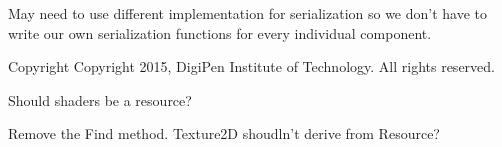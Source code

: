 \begin{DoxyRefList}
\item[\label{todo__todo000051}%
\hypertarget{todo__todo000051}{}%
File \hyperlink{Serialization_8h}{Serialization.h} ]May need to use different implementation for serialization so we don't have to write our own serialization functions for every individual component. \begin{DoxyCopyright}{Copyright}
Copyright 2015, Digi\-Pen Institute of Technology. All rights reserved.  
\end{DoxyCopyright}

\item[\label{todo__todo000010}%
\hypertarget{todo__todo000010}{}%
File \hyperlink{Shader_8cpp}{Shader.cpp} ]Should shaders be a resource?  
\item[\label{todo__todo000012}%
\hypertarget{todo__todo000012}{}%
File \hyperlink{Texture2D_8h}{Texture2\-D.h} ]Remove the Find method. Texture2\-D shoudln't derive from Resource?
\end{DoxyRefList}